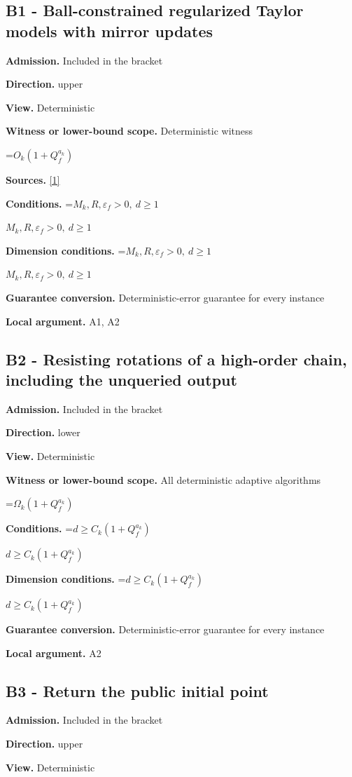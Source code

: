 \documentclass[10pt,a4paper]{article}
\newcommand{\AtlasMath}[1]{\par\begingroup\centering\setbox0=\hbox{$\displaystyle #1$}\ifdim\wd0>1.4\linewidth\typeout{ATLAS WIDE FORMULA: \the\wd0}\fi\ifdim\wd0>\linewidth\resizebox{\linewidth}{!}{\box0}\else\box0\fi\par\endgroup}
\newcommand{\AtlasInlineMath}[1]{\begingroup\setbox0=\hbox{$#1$}\ifdim\wd0>.4\linewidth\endgroup\AtlasMath{#1}\else\endgroup$#1$\fi}
\begin{document}
\subsection{B1 - Ball-constrained regularized Taylor models with mirror updates}
\textbf{Admission.} Included in the bracket

\textbf{Direction.} upper

\textbf{View.} Deterministic

\textbf{Witness or lower-bound scope.} Deterministic witness

\AtlasMath{O_k(1+Q_f^{a_k})}
\textbf{Sources.} \href{https://arxiv.org/pdf/2411.08987v2}{[1]}

\textbf{Conditions.} \AtlasInlineMath{M_k,R,\varepsilon_f>0,\ d\ge1}

\textbf{Dimension conditions.} \AtlasInlineMath{M_k,R,\varepsilon_f>0,\ d\ge1}

\textbf{Guarantee conversion.} Deterministic-error guarantee for every instance

\textbf{Local argument.} A1, A2

\subsection{B2 - Resisting rotations of a high-order chain, including the unqueried output}
\textbf{Admission.} Included in the bracket

\textbf{Direction.} lower

\textbf{View.} Deterministic

\textbf{Witness or lower-bound scope.} All deterministic adaptive algorithms

\AtlasMath{\Omega_k(1+Q_f^{a_k})}
\textbf{Conditions.} \AtlasInlineMath{d\ge C_k(1+Q_f^{a_k})}

\textbf{Dimension conditions.} \AtlasInlineMath{d\ge C_k(1+Q_f^{a_k})}

\textbf{Guarantee conversion.} Deterministic-error guarantee for every instance

\textbf{Local argument.} A2

\subsection{B3 - Return the public initial point}
\textbf{Admission.} Included in the bracket

\textbf{Direction.} upper

\textbf{View.} Deterministic
\end{document}

